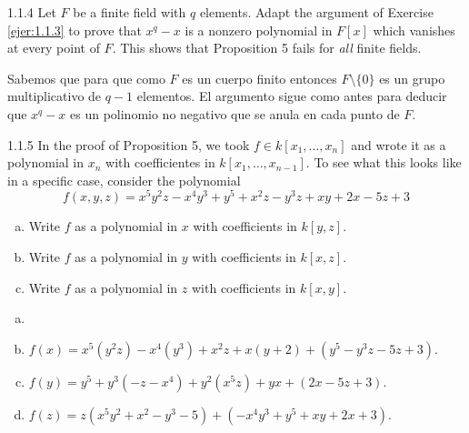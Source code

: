 \documentclass[twoside]{article}
\begin{document}
\newpage

\begin{ejercicio}{1.1.4}
Let $F$ be a finite field with $q$ elements.
Adapt the argument of Exercise \ref{ejer:1.1.3} to prove that $x^q-x$ is a nonzero polynomial in $F[x]$ which vanishes at every point of $F$.
This shows that Proposition 5 fails for \emph{all} finite fields.
\end{ejercicio}
\begin{solucion}
Sabemos que para que como $F$ es un cuerpo finito entonces $F\setminus\{0\}$ es un grupo multiplicativo de $q-1$ elementos.
El argumento sigue como antes para deducir que $x^q-x$ es un polinomio no negativo que se anula en cada punto de $F$.
\end{solucion}

\newpage

\begin{ejercicio}{1.1.5}
In the proof of Proposition 5, we took $f \in k[x_1,\dots,x_n]$ and wrote it as a polynomial in $x_n$ with coefficientes in $k[x_1,\dots,x_{n-1}]$.
To see what this looks like in a specific case, consider the polynomial
\[ f(x,y,z) = x^5y^2z-x^4y^3+y^5+x^2z-y^3z+xy+2x-5z+3 \]
\begin{enumerate}[a.]
\item Write $f$ as a polynomial in $x$ with coefficients in $k[y,z]$.
\item Write $f$ as a polynomial in $y$ with coefficients in $k[x,z]$.
\item Write $f$ as a polynomial in $z$ with coefficients in $k[x,y]$.
\end{enumerate}
\end{ejercicio}
\begin{solucion}
\begin{enumerate}[a.]
\item[]
\item $f(x)=x^5(y^2z)-x^4(y^3)+x^2z+x(y+2)+(y^5-y^3z-5z+3)$.
\item $f(y)=y^5+y^3(-z-x^4)+y^2(x^5z)+yx+(2x-5z+3)$.
\item $f(z)=z(x^5y^2+x^2-y^3-5)+(-x^4y^3+y^5+xy+2x+3)$.
\end{enumerate}
\end{solucion}

\newpage
\end{document}
